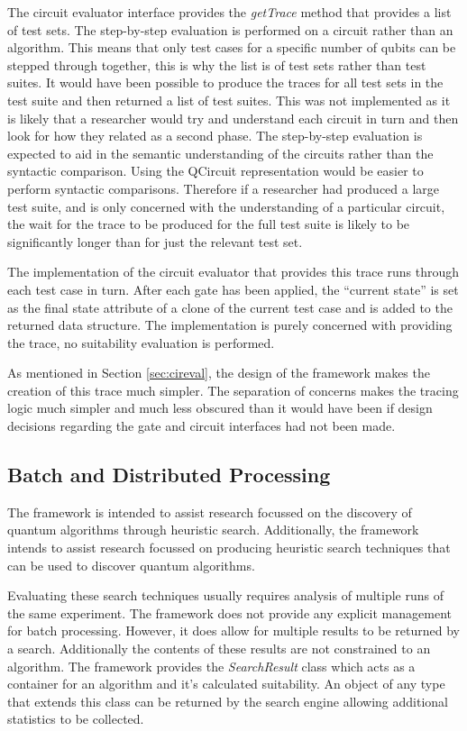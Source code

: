The circuit evaluator interface provides the \emph{getTrace} method that provides a list of test sets.
The step-by-step evaluation is performed on a circuit rather than an algorithm.
This means that only test cases for a specific number of qubits can be stepped through together, this is why the list is of test sets rather than test suites.
It would have been possible to produce the traces for all test sets in the test suite and then returned a list of test suites.
This was not implemented as it is likely that a researcher would try and understand each circuit in turn and then look for how they related as a second phase.
The step-by-step evaluation is expected to aid in the semantic understanding of the circuits rather than the syntactic comparison.
Using the QCircuit representation would be easier to perform syntactic comparisons.
Therefore if a researcher had produced a large test suite, and is only concerned with the understanding of a particular circuit, the wait for the trace to be produced for the full test suite is likely to be significantly longer than for just the relevant test set.

The implementation of the circuit evaluator that provides this trace runs through each test case in turn.
After each gate has been applied, the ``current state'' is set as the final state attribute of a clone of the current test case and is added to the returned data structure.
The implementation is purely concerned with providing the trace, no suitability evaluation is performed.

As mentioned in Section \ref{sec:cireval}, the design of the framework makes the creation of this trace much simpler.
The separation of concerns makes the tracing logic much simpler and much less obscured than it would have been if design decisions regarding the gate and circuit interfaces had not been made.

\subsection{Batch and Distributed Processing}
The framework is intended to assist research focussed on the discovery of quantum algorithms through heuristic search.
Additionally, the framework intends to assist research focussed on producing heuristic search techniques that can be used to discover quantum algorithms.

Evaluating these search techniques usually requires analysis of multiple runs of the same experiment.
The framework does not provide any explicit management for batch processing.
However, it does allow for multiple results to be returned by a search.
Additionally the contents of these results are not constrained to an algorithm.
The framework provides the \emph{SearchResult} class which acts as a container for an algorithm and it's calculated suitability.
An object of any type that extends this class can be returned by the search engine allowing additional statistics to be collected.

